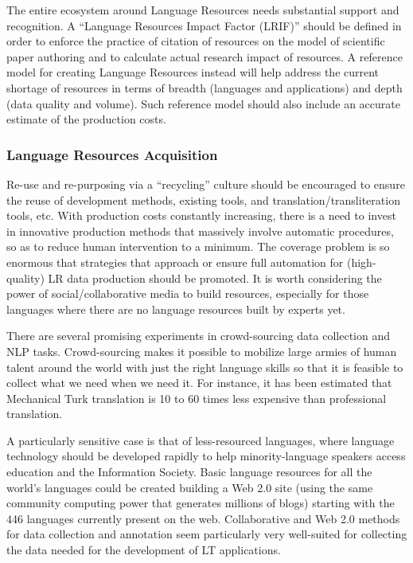 \documentclass[10pt, plain]{../../metanetpaper}
\begin{document}
\begin{multicols}{2}
The entire ecosystem around Language Resources needs substantial support and recognition. A “Language Resources Impact Factor (LRIF)” should be defined in order to enforce the practice of citation of resources on the model of scientific paper authoring and to calculate actual research impact of resources.
A reference model for creating Language Resources instead will help address the current shortage of resources in terms of breadth (languages and applications) and depth (data quality and volume). Such reference model should also include an accurate estimate of the production costs.

\subsubsection{Language Resources Acquisition}
\label{sec:lang-reso-acqu}

Re-use and re-purposing via a “recycling” culture should be encouraged to ensure the reuse of development methods, existing tools, and translation/transliteration tools, etc. With production costs constantly increasing, there is a need to invest in innovative production methods that massively involve automatic procedures, so as to reduce human intervention to a minimum. The coverage problem is so enormous that strategies that approach or ensure full automation for (high-quality) LR data production should be promoted. It is worth considering the power of social/collaborative media to build resources, especially for those languages where there are no language resources built by experts yet.  

There are several promising experiments in crowd-sourcing data collection and NLP tasks. Crowd-sourcing makes it possible to mobilize large armies of human talent around the world with just the right language skills so that it is feasible to collect what we need when we need it. For instance, it has been estimated that Mechanical Turk translation is 10 to 60 times less expensive than professional translation. 

A particularly sensitive case is that of less-resourced languages, where language technology should be developed rapidly to help minority-language speakers access education and the Information Society. Basic language resources for all the world’s languages could be created building a Web 2.0 site (using the same community computing power that generates millions of blogs) starting with the 446 languages currently present on the web. Collaborative and Web 2.0 methods for data collection and annotation seem particularly very well-suited for collecting the data needed for the development of LT applications. 


\end{multicols}
\end{document}
